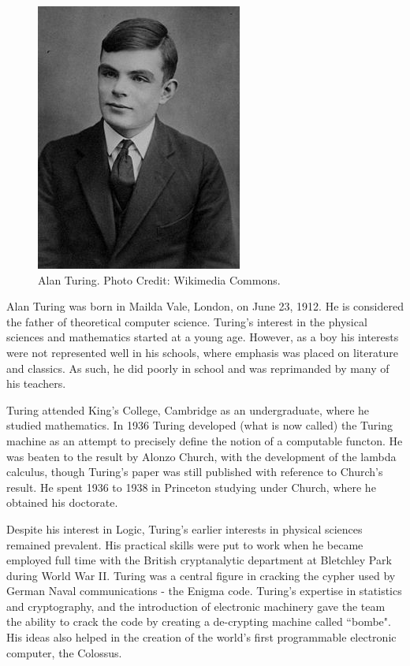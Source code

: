 \documentclass[../../../include/open-logic-section]{subfiles}
\begin{document}


\begin{figure}[h!] 
\centering 
\includegraphics[scale=0.75]{alan-turing.jpg}
\caption{Alan Turing. Photo Credit: Wikimedia Commons.} 
\end{figure}

Alan Turing was born in Mailda Vale, London, on June 23, 1912. He is
considered the father of theoretical computer science. Turing's interest in
the physical sciences and mathematics started at a young age. However, as a
boy his interests were not represented well in his schools, where emphasis
was placed on literature and classics. As such, he did poorly in school and
was reprimanded by many of his teachers.

Turing attended King's College, Cambridge as an undergraduate, where he
studied mathematics. In 1936 Turing developed (what is now called) the
Turing machine as an attempt to precisely define the notion of a computable
functon. He was beaten to the result by Alonzo Church, with the development
of the lambda calculus, though Turing's paper was still published with
reference to Church's result. He spent 1936 to 1938 in Princeton studying
under Church, where he obtained his doctorate.

Despite his interest in Logic, Turing's earlier interests in physical
sciences remained prevalent. His practical skills were put to work when he
became employed full time with the British cryptanalytic department at
Bletchley Park during World War II. Turing was a central figure in cracking
the cypher used by German Naval communications - the Enigma code. 
 Turing's expertise in statistics and cryptography, and the introduction of electronic
machinery gave the team the ability to crack the code by creating a 
de-crypting machine called ``bombe". His ideas also helped in the creation
of the world's first programmable electronic computer, the Colossus.
\end{document}
